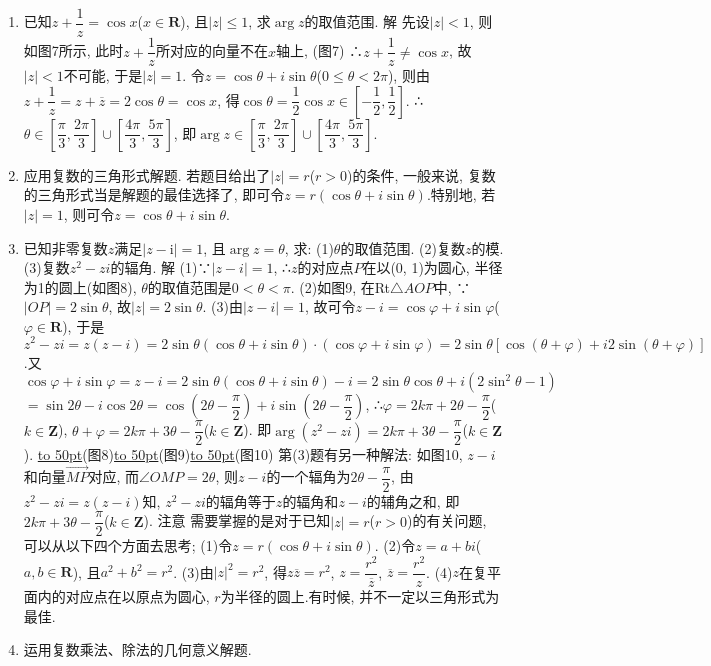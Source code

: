 \documentclass[10pt,a4paper]{article}
\newcommand{\blank}[1]{\underline{\hbox to #1pt{}}}
\begin{document}
\begin{enumerate}[1.]
(图6)
\item 已知$z+\dfrac 1z=\cos x$($x\in \mathbf{R}$), 且$|z|\le 1$, 求$\arg z$的取值范围.
解  先设$|z|<1$, 则如图7所示, 此时$z+\dfrac 1z$所对应的向量不在$x$轴上,
(图7)
∴$z+\dfrac 1z\ne \cos x$,
故$|z|<1$不可能, 于是$|z|=1$.
令$z=\cos \theta +i\sin \theta$($0\le \theta <2\pi$),
则由$z+\dfrac 1z=z+\overline z=2\cos \theta =\cos x$,
得$\cos \theta =\dfrac 12\cos x\in [-\dfrac 12,\dfrac 12]$.
∴$\theta \in [\dfrac{\pi }3,\dfrac{2\pi }3]\cup [\dfrac{4\pi }3,\dfrac{5\pi }3]$, 即$\arg z\in [\dfrac{\pi }3,\dfrac{2\pi }3]\cup [\dfrac{4\pi }3,\dfrac{5\pi }3]$.
\item 应用复数的三角形式解题.
若题目给出了$|z|=r$($r>0$)的条件, 一般来说, 复数的三角形式当是解题的最佳选择了, 即可令$z=r(\cos \theta +i\sin \theta)$.特别地, 若$|z|=1$, 则可令$z=\cos \theta +i\sin \theta$.
\item 已知非零复数$z$满足$|z-\mathrm{i}|=1$, 且$\arg z=\theta$, 求:
(1)$\theta$的取值范围.	(2)复数$z$的模.	(3)复数$z^2-zi$的辐角.
解  (1)∵$|z-i|=1$, ∴$z$的对应点$P$在以(0, 1)为圆心, 半径为1的圆上(如图8), $\theta$的取值范围是$0<\theta <\pi$.
(2)如图9, 在Rt$\triangle AOP$中,
∵$|OP|=2\sin \theta$, 故$|z|=2\sin \theta$.
(3)由$|z-i|=1$, 故可令$z-i=\cos \varphi +i\sin \varphi$($\varphi \in \mathbf{R}$),
于是$z^2-zi=z(z-i)=2\sin \theta (\cos \theta +i\sin \theta)\cdot (\cos \varphi +i\sin \varphi)=2\sin \theta [\cos (\theta +\varphi)+i2\sin (\theta +\varphi)]$.又$\cos \varphi +i\sin \varphi =z-i=2\sin \theta (\cos \theta +i\sin \theta)-i=2\sin \theta \cos \theta +i(2\sin ^2\theta -1)$
$=\sin 2\theta -i\cos 2\theta =\cos (2\theta -\dfrac{\pi }2)+i\sin (2\theta -\dfrac{\pi }2)$,
∴$\varphi =2k\pi +2\theta -\dfrac{\pi }2$($k\in \mathbf{Z}$), $\theta +\varphi =2k\pi +3\theta -\dfrac{\pi }2$($k\in \mathbf{Z}$).
即$\arg (z^2-zi)=2k\pi +3\theta -\dfrac{\pi }2$($k\in \mathbf{Z}$).
\blank{50}(图8)\blank{50}(图9)\blank{50}(图10)
第(3)题有另一种解法: 如图10, $z-i$和向量$\overrightarrow{MP}$对应, 而$\angle OMP=2\theta$, 则$z-i$的一个辐角为$2\theta -\dfrac{\pi }2$, 由$z^2-zi=z(z-i)$知, $z^2-zi$的辐角等于$z$的辐角和$z-i$的辅角之和, 即$2k\pi +3\theta -\dfrac{\pi }2$($k\in \mathbf{Z}$).
注意  需要掌握的是对于已知$|z|=r$($r>0$)的有关问题, 可以从以下四个方面去思考;
(1)令$z=r(\cos \theta +i\sin \theta)$.
(2)令$z=a+bi$($a,b\in \mathbf{R}$), 且$a^2+b^2=r^2$.
(3)由$|z|^2=r^2$, 得$z\overline z=r^2$, $z=\dfrac{r^2}{\overline z}$, $\overline z=\dfrac{r^2}z$.
(4)$z$在复平面内的对应点在以原点为圆心, $r$为半径的圆上.有时候, 并不一定以三角形式为最佳.
\item 运用复数乘法、除法的几何意义解题.

\end{enumerate}
\end{document}
